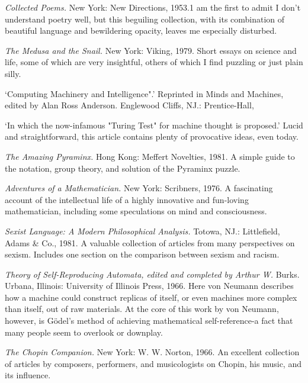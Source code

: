  {\sl Collected Poems.} New York: New Directions, 1953.1 am the first to admit I don't understand poetry well, but this beguiling collection, with its combination of beautiful language and bewildering opacity, leaves me especially disturbed.

 {\sl The Medusa and the Snail.} New York: Viking, 1979. Short essays on science and life, some of which are very insightful, others of which I find puzzling or just plain silly.

 `Computing Machinery and Intelligence".' Reprinted in Minds and Machines, edited by Alan Ross Anderson. Englewood Cliffs, NJ.: Prentice-Hall,

 `In which the now-infamous "Turing Test" for machine thought is proposed.' Lucid and straightforward, this article contains plenty of provocative ideas, even today.

 {\sl The Amazing Pyraminx.} Hong Kong: Meffert Novelties, 1981. A simple guide to the notation, group theory, and solution of the Pyraminx puzzle.

 {\sl Adventures of a Mathematician.} New York: Scribners, 1976. A fascinating account of the intellectual life of a highly innovative and fun-loving mathematician, including some speculations on mind and consciousness.

 {\sl Sexist Language: A Modern Philosophical Analysis.} Totowa, NJ.: Littlefield, Adams \& Co., 1981. A valuable collection of articles from many perspectives on sexism. Includes one section on the comparison between sexism and racism.

 {\sl Theory of Self-Reproducing Automata, edited and completed by Arthur W.} Burks. Urbana, Illinois: University of Illinois Press, 1966. Here von Neumann describes how a machine could construct replicas of itself, or even machines more complex than itself, out of raw materials. At the core of this work by von Neumann, however, is Gödel’s method of achieving mathematical self-reference-a fact that many people seem to overlook or downplay.

 {\sl The Chopin Companion.} New York: W. W. Norton, 1966. An excellent collection of articles by composers, performers, and musicologists on Chopin, his music, and its influence.

